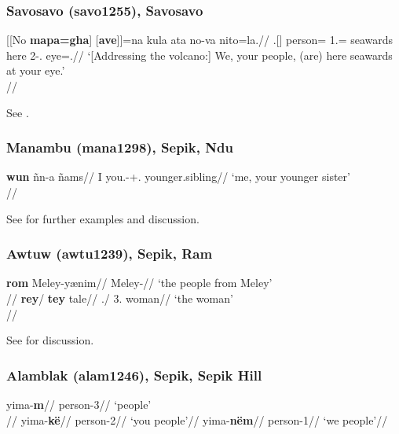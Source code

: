 \subsubsection{Savosavo (savo1255), Savosavo}

\ex \begingl
\gla {}[[No \textbf{mapa=gha}] [\textbf{ave}]]=na kula ata no-va nito=la.//
\Sg.[\Gen] person=\Pl{} 1\Pl.\Excl=\Nom{} seawards here 2\Sg-\Gen.\M{} eye=\Loc.\M{}//
\glft `[Addressing the volcano:] We, your people, (are) here seawards at your eye.'\\\citep[155, (285)]{wegener2012}//
\endgl
\xe

See \citet[147,155--159]{wegener2012}.

\subsubsection{Manambu (mana1298), Sepik, Ndu}

\ex \begingl
\gla \textbf{wun} ñ\textschwa{}n-a ñam\textschwa{}s//
\glb I you.\F-\Lnk+\F.\Sg{} younger.sibling//
\glft `me, your younger sister'\\\citep[197]{aikhenvald2008}//
\endgl
\xe

See \citet[197f., 508--513]{aikhenvald2008} for further examples and discussion.

\subsubsection{Awtuw (awtu1239), Sepik, Ram}


\pex \a
\begingl
\gla \textbf{rom} Meley-y\ae{}nim//
\Pl{} Meley-\Generic{}//
\glft `the people from Meley' \\\citep[122, (15a)]{feldman1986}//
\endgl
\a 
\begingl
\gla \textbf{rey}/ \textbf{tey} tale//
\M.\Sg{}/ 3\F.\Sg{} woman//
\glft `the woman'\\\citep[123, (21a)]{feldman1986}//
\endgl
\xe

See \citet[120--124]{feldman1986} for discussion.

\newpage

\subsubsection{Alamblak (alam1246), Sepik, Sepik Hill}

\pex %
\vspace{-1.832\baselineskip}
\begin{multicols}{3}
\a
\begingl 
\gla yima-\textbf{m}//
\glb person-3\Pl{}//
\glft `people'\\\citep[96]{bruce1984}//
\endgl
\a
\begingl
\gla yima-\textbf{k\"{e}}//
\glb person-2\Pl{}//
\glft `you people'//
\endgl
\a
\begingl
\gla yima-\textbf{n\"em}//
\glb person-1\Pl{}//
\glft `we people'//
\endgl
\end{multicols}
\xe


